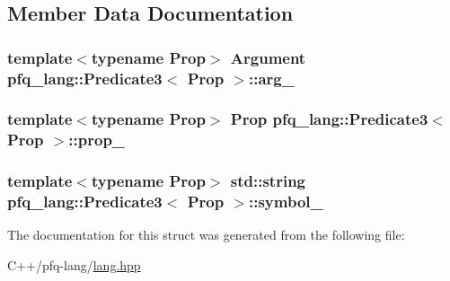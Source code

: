 \subsection{Member Data Documentation}
\hypertarget{structpfq__lang_1_1Predicate3_adf52e42c7be28e2cb25d2f188e501f48}{
\subsubsection[{arg\+\_\+}]{\setlength{\rightskip}{0pt plus 5cm}template$<$typename Prop$>$ {\bf Argument} {\bf pfq\+\_\+lang\+::\+Predicate3}$<$ Prop $>$\+::arg\+\_\+}}\label{structpfq__lang_1_1Predicate3_adf52e42c7be28e2cb25d2f188e501f48}
\hypertarget{structpfq__lang_1_1Predicate3_a3d1b5001e401ee228375eefc72da5d88}{
\subsubsection[{prop\+\_\+}]{\setlength{\rightskip}{0pt plus 5cm}template$<$typename Prop$>$ Prop {\bf pfq\+\_\+lang\+::\+Predicate3}$<$ Prop $>$\+::prop\+\_\+}}\label{structpfq__lang_1_1Predicate3_a3d1b5001e401ee228375eefc72da5d88}
\hypertarget{structpfq__lang_1_1Predicate3_acd29e8718600ed723e659fa19251a6f5}{
\subsubsection[{symbol\+\_\+}]{\setlength{\rightskip}{0pt plus 5cm}template$<$typename Prop$>$ std\+::string {\bf pfq\+\_\+lang\+::\+Predicate3}$<$ Prop $>$\+::symbol\+\_\+}}\label{structpfq__lang_1_1Predicate3_acd29e8718600ed723e659fa19251a6f5}


The documentation for this struct was generated from the following file\+:\begin{DoxyCompactItemize}
\item 
C++/pfq-\/lang/\hyperlink{lang_8hpp}{lang.\+hpp}\end{DoxyCompactItemize}

